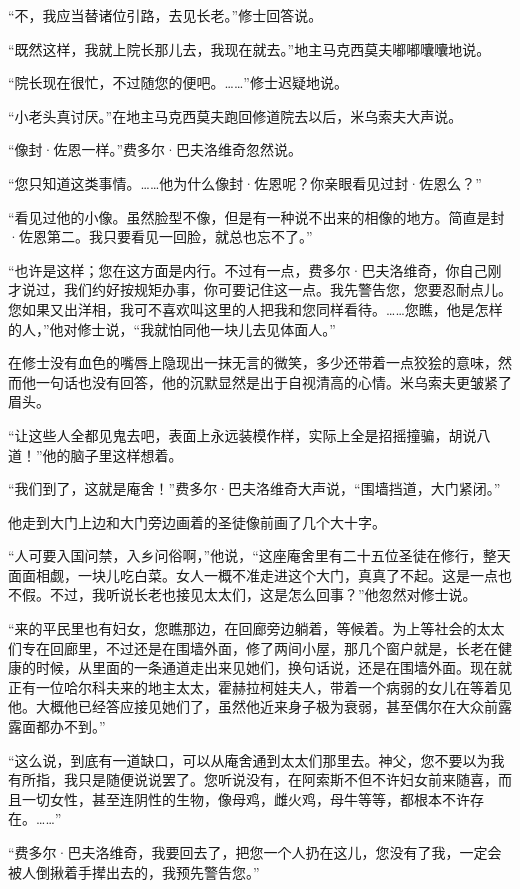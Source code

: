 \par “不，我应当替诸位引路，去见长老。”修士回答说。
\par “既然这样，我就上院长那儿去，我现在就去。”地主马克西莫夫嘟嘟囔囔地说。
\par “院长现在很忙，不过随您的便吧。……”修士迟疑地说。
\par “小老头真讨厌。”在地主马克西莫夫跑回修道院去以后，米乌索夫大声说。
\par “像封·佐恩一样。”费多尔·巴夫洛维奇忽然说。
\par “您只知道这类事情。……他为什么像封·佐恩呢？你亲眼看见过封·佐恩么？”
\par “看见过他的小像。虽然脸型不像，但是有一种说不出来的相像的地方。简直是封·佐恩第二。我只要看见一回脸，就总也忘不了。”
\par “也许是这样；您在这方面是内行。不过有一点，费多尔·巴夫洛维奇，你自己刚才说过，我们约好按规矩办事，你可要记住这一点。我先警告您，您要忍耐点儿。您如果又出洋相，我可不喜欢叫这里的人把我和您同样看待。……您瞧，他是怎样的人，”他对修士说，“我就怕同他一块儿去见体面人。”
\par 在修士没有血色的嘴唇上隐现出一抹无言的微笑，多少还带着一点狡狯的意味，然而他一句话也没有回答，他的沉默显然是出于自视清高的心情。米乌索夫更皱紧了眉头。
\par “让这些人全都见鬼去吧，表面上永远装模作样，实际上全是招摇撞骗，胡说八道！”他的脑子里这样想着。
\par “我们到了，这就是庵舍！”费多尔·巴夫洛维奇大声说，“围墙挡道，大门紧闭。”
\par 他走到大门上边和大门旁边画着的圣徒像前画了几个大十字。
\par “人可要入国问禁，入乡问俗啊，”他说，“这座庵舍里有二十五位圣徒在修行，整天面面相觑，一块儿吃白菜。女人一概不准走进这个大门，真真了不起。这是一点也不假。不过，我听说长老也接见太太们，这是怎么回事？”他忽然对修士说。
\par “来的平民里也有妇女，您瞧那边，在回廊旁边躺着，等候着。为上等社会的太太们专在回廊里，不过还是在围墙外面，修了两间小屋，那几个窗户就是，长老在健康的时候，从里面的一条通道走出来见她们，换句话说，还是在围墙外面。现在就正有一位哈尔科夫来的地主太太，霍赫拉柯娃夫人，带着一个病弱的女儿在等着见他。大概他已经答应接见她们了，虽然他近来身子极为衰弱，甚至偶尔在大众前露露面都办不到。”
\par “这么说，到底有一道缺口，可以从庵舍通到太太们那里去。神父，您不要以为我有所指，我只是随便说说罢了。您听说没有，在阿索斯不但不许妇女前来随喜，而且一切女性，甚至连阴性的生物，像母鸡，雌火鸡，母牛等等，都根本不许存在。……”
\par “费多尔·巴夫洛维奇，我要回去了，把您一个人扔在这儿，您没有了我，一定会被人倒揪着手撵出去的，我预先警告您。”
